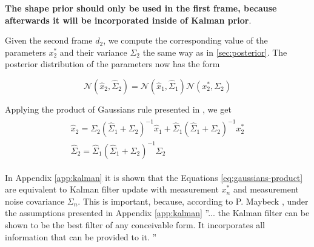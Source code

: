 \documentclass[10pt,twocolumn,letterpaper]{article}
\begin{document}
\textbf{\color{accent}The shape prior should only be used in the first frame, because afterwards it will be incorporated inside of Kalman prior}.

Given the second frame $d_2$, we compute the corresponding value of the parameters $x_2^*$ and their variance $\Sigma_2$ the same way as in \ref{sec:posterior}. The posterior distribution of the parameters now has the form 

\begin{equation}
\mathcal{N}(\hat{x}_2, \hat{\Sigma}_2) = \mathcal{N}(\hat{x}_1, \hat{\Sigma}_1) \mathcal{N}(x_2^*, \Sigma_2)
\end{equation}

Applying the product of Gaussians rule presented in \cite{petersen2008matrix}, we get 
\begin{align}
\begin{split}
\hat{x}_2 = \Sigma_2 (\hat{\Sigma}_1 + \Sigma_2)^{-1} \hat{x}_1 + 
\hat{\Sigma}_1 (\hat{\Sigma}_1 + \Sigma_2)^{-1} x_2^*\\
\hat{\Sigma}_2 = \hat{\Sigma}_1 (\hat{\Sigma}_1 + \Sigma_2)^{-1} \Sigma_2
\end{split} \label{eq:gaussians-product}
\end{align}

In Appendix \ref{app:kalman} it is shown that the Equations \ref{eq:gaussians-product} are equivalent to Kalman filter update with measurement $x_n^*$ and measurement noise covariance $\Sigma_n$. This is important, because, according to P. Maybeck \cite{maybeck1979stochastic}, under the assumptions presented in Appendix \ref{app:kalman} ''... the Kalman filter can be shown to be the best filter of any conceivable form. It incorporates all information that can be provided to it. ''
\end{document}
